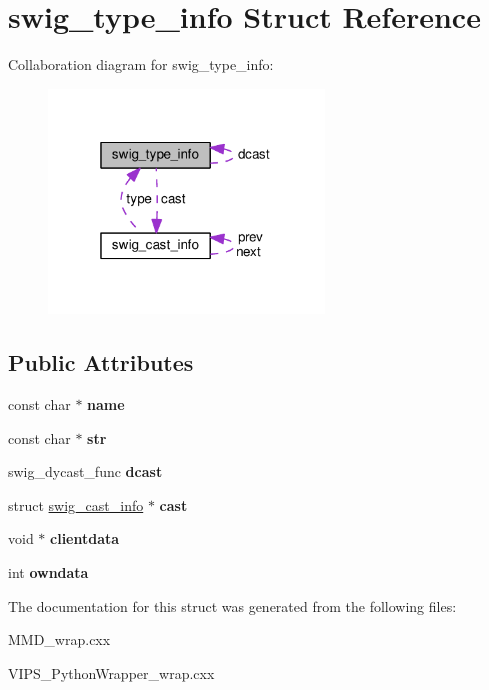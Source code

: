 \hypertarget{structswig__type__info}{}\section{swig\+\_\+type\+\_\+info Struct Reference}
\label{structswig__type__info}


Collaboration diagram for swig\+\_\+type\+\_\+info\+:\nopagebreak
\begin{figure}[H]
\begin{center}
\leavevmode
\includegraphics[width=208pt]{structswig__type__info__coll__graph}
\end{center}
\end{figure}
\subsection*{Public Attributes}
\begin{DoxyCompactItemize}
\item 
const char $\ast$ {\bfseries name}\hypertarget{structswig__type__info_aa6c9f9ed3037043b6d346162cf932daf}{}\label{structswig__type__info_aa6c9f9ed3037043b6d346162cf932daf}

\item 
const char $\ast$ {\bfseries str}\hypertarget{structswig__type__info_aaafd19f362ddc521d6a846ce41044471}{}\label{structswig__type__info_aaafd19f362ddc521d6a846ce41044471}

\item 
swig\+\_\+dycast\+\_\+func {\bfseries dcast}\hypertarget{structswig__type__info_a07df4bedf85be77b23756b531b60e0dd}{}\label{structswig__type__info_a07df4bedf85be77b23756b531b60e0dd}

\item 
struct \hyperlink{structswig__cast__info}{swig\+\_\+cast\+\_\+info} $\ast$ {\bfseries cast}\hypertarget{structswig__type__info_ae535f16234db99893f07880cb94a848e}{}\label{structswig__type__info_ae535f16234db99893f07880cb94a848e}

\item 
void $\ast$ {\bfseries clientdata}\hypertarget{structswig__type__info_a2e1f9087e639dd7c8c131fbc6e399194}{}\label{structswig__type__info_a2e1f9087e639dd7c8c131fbc6e399194}

\item 
int {\bfseries owndata}\hypertarget{structswig__type__info_a93c25d5903cbfcb82208eea7227c32bd}{}\label{structswig__type__info_a93c25d5903cbfcb82208eea7227c32bd}

\end{DoxyCompactItemize}


The documentation for this struct was generated from the following files\+:\begin{DoxyCompactItemize}
\item 
M\+M\+D\+\_\+wrap.\+cxx\item 
V\+I\+P\+S\+\_\+\+Python\+Wrapper\+\_\+wrap.\+cxx\end{DoxyCompactItemize}
